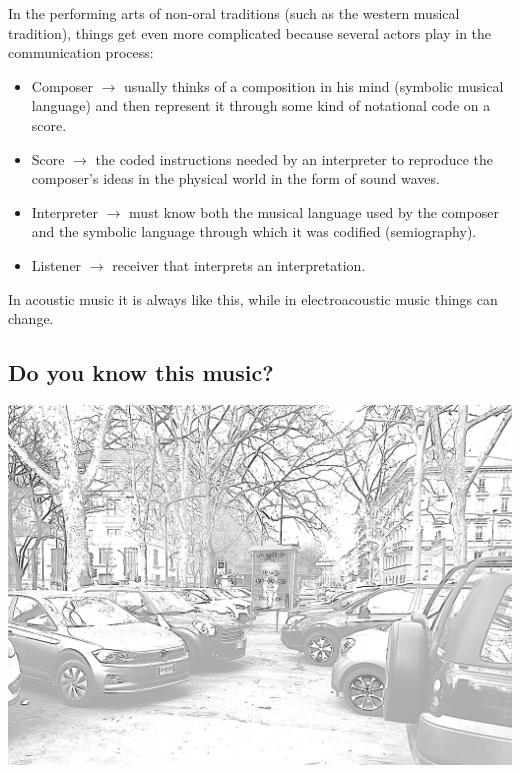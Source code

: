 In the performing arts of non-oral traditions (such as the western musical tradition), things get even more complicated because several actors play in the communication process:

\begin{itemize}
\tightlist
\item Composer \(\rightarrow\) usually thinks of a composition in his mind (symbolic musical language) and then represent it through some kind of notational code on a score.
\item Score \(\rightarrow\) the coded instructions needed by an interpreter to reproduce the composer's ideas in the physical world in the form of sound waves.
\item Interpreter \(\rightarrow\) must know both the musical language used by the composer and the symbolic language through which it was codified (semiography).
\item Listener \(\rightarrow\) receiver that interprets an interpretation.
\end{itemize}

In acoustic music it is always like this, while in electroacoustic music things can change.

\subsection{Do you know this music? }\label{do-you-know-this-music}

\begin{center}
\includegraphics[scale=0.4]{../img/parcheggio.png}
\end{center}

